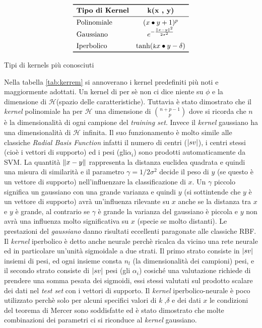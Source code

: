 \begin{table}[htp]
\centering
\[ 
\begin{array}{lc} 
\toprule
\text{\textbf{Tipo di Kernel}} & \text{\textbf{k(x , y)}}  \\
\midrule  
\text{Polinomiale}  &  (x \bullet y +1)^p \\
\text{Gaussiano}  &  e^{-\frac{\norma{x-y}^{2}}{2\sigma^2}}\\[1ex]
\text{Iperbolico}  & \tanh(\text{{\footnotesize {\textsl k}}}x \bullet y - \delta) \\

\bottomrule
\end{array}
\]
 \caption[Kernels più noti]{Tipi di kernels più conosciuti}
\label{tab:kerrem}
\end{table}  

Nella tabella \ref{tab:kerrem} si annoverano i kernel predefiniti più noti e maggiormente adottati. Un kernel di per sè non ci dice niente su $\phi$ e la dimensione di $\mathcal{H}$(spazio delle caratteristiche). Tuttavia è stato dimostrato che il \textit{kernel} polinomiale ha per  $\mathcal{H}$ una dimensione di $\binom{n+p-1}{p}$ dove si ricorda che $n$ è la dimensionalità di ogni campione del \textit{training set}. Invece il \textit{kernel} gaussiano ha una dimensionalità di $\mathcal{H}$ infinita. Il suo funzionamento è molto simile alle classiche \textit{Radial Basis Function} infatti  il numero di centri ($\lvert sv\rvert$), i centri stessi (cioè i vettori di supporto) ed i pesi (gli$ \alpha_i$) sono prodotti automaticamente da \ac{SVM}. La quantità $\lVert x-y\rVert$ rappresenta la distanza euclidea quadrata e quindi una misura di similarità e il parametro $\gamma = 1/2\sigma^2$ decide il peso di $y$ (se questo è un vettore di supporto) nell'influenzare la classificazione di $x$. Un $\gamma$ piccolo significa un gaussiano con una grande varianza e quindi $y$ (si sottintende che $y$ è un vettore di supporto) avrà un'influenza rilevante su $x$ anche se la distanza tra $x$ e $y$ è grande, al contrario se $\gamma$ è grande la varianza del gaussiano è piccola e $y$ non avrà una influenza molto significativa su $x$ (specie se molto distanti). Le prestazioni del \textit{gaussiano} danno risultati eccellenti paragonate alle classiche RBF.  Il \textit{kernel} iperbolico è detto anche neurale perchè ricalca da vicino una rete neurale ed in particolare un'unità sigmoidale a due strati. Il primo strato consiste in $\lvert sv\rvert$ insiemi di pesi, ed ogni insieme consta $n_l$ (la dimensionalità dei campioni) pesi, e il secondo strato consiste di $\lvert sv\rvert$ pesi (gli $\alpha_i$) cosiché una valutazione richiede di prendere una somma pesata dei sigmoidi, essi stessi valutati sul prodotto scalare dei dati nel \textit{test set} con i vettori di supporto. Il \textit{kernel} iperbolico-neurale è poco utilizzato perchè solo per alcuni specifici valori di {\footnotesize {\textsl k}} ,$\delta$ e dei dati $x$ le condizioni del teorema di Mercer sono soddisfatte ed è stato dimostrato che molte combinazioni dei parametri ci si riconduce al \textit{kernel} gaussiano.\\
